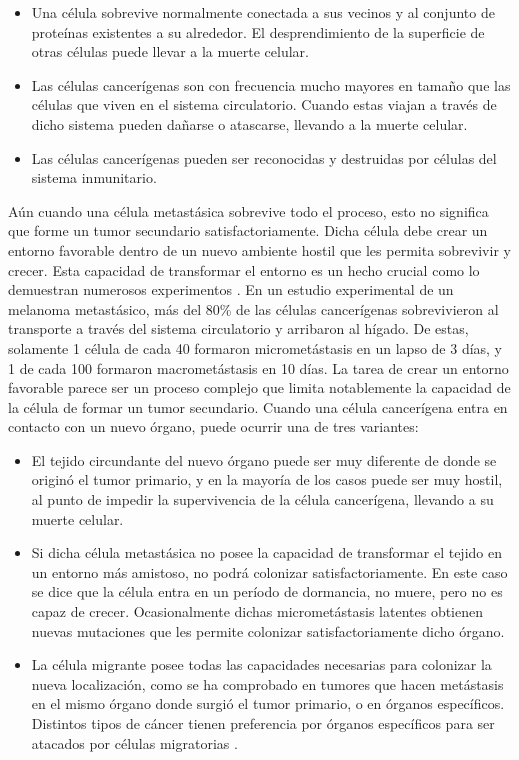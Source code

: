 \begin{itemize}
    \item Una célula sobrevive normalmente conectada a sus vecinos y al conjunto de proteínas existentes a su alrededor. El desprendimiento de la superficie de otras células puede llevar a la muerte celular.
    \item Las células cancerígenas son con frecuencia mucho mayores en tamaño que las células que viven en el sistema circulatorio. Cuando estas viajan a través de dicho sistema pueden dañarse o atascarse, llevando a la muerte celular.
    \item Las células cancerígenas pueden ser reconocidas y destruidas por células del sistema inmunitario.
\end{itemize}

\hspace{.1cm}Aún cuando una célula metastásica sobrevive todo el proceso, esto no significa que forme un tumor secundario satisfactoriamente. Dicha célula debe crear un entorno favorable dentro de un nuevo ambiente hostil que les permita sobrevivir y crecer. Esta capacidad de transformar el entorno es un hecho crucial como lo demuestran numerosos experimentos \cite{pubmed}. En un estudio experimental de un melanoma metastásico, más del 80\% de las células cancerígenas sobrevivieron al transporte a través del sistema circulatorio y arribaron al hígado. De estas, solamente 1 célula de cada 40 formaron micrometástasis en un lapso de 3 d\'ias, y 1 de cada 100 formaron macrometástasis en 10 días. La tarea de crear un entorno favorable parece ser un proceso complejo que limita notablemente la capacidad de la célula de formar un tumor secundario. Cuando una célula cancerígena entra en contacto con un nuevo órgano, puede ocurrir una de tres variantes:
\begin{itemize}
    \item El tejido circundante del nuevo órgano puede ser muy diferente de donde se originó el tumor primario, y en la mayoría de los casos puede ser muy hostil, al punto de impedir la supervivencia de la célula cancerígena, llevando a su muerte celular.
    \item Si dicha célula metastásica no posee la capacidad de transformar el tejido en un entorno más amistoso, no podrá colonizar satisfactoriamente. En este caso se dice que la célula entra en un período de dormancia, no muere, pero no es capaz de crecer. Ocasionalmente dichas micrometástasis latentes obtienen nuevas mutaciones que les permite colonizar satisfactoriamente dicho órgano.
    \item La célula migrante posee todas las capacidades necesarias para colonizar la nueva localización, como se ha comprobado en tumores que hacen metástasis en el mismo órgano donde surgió el tumor primario, o en órganos específicos. Distintos tipos de cáncer tienen preferencia por órganos específicos para ser atacados por células migratorias \cite{invasion}.
\end{itemize}

